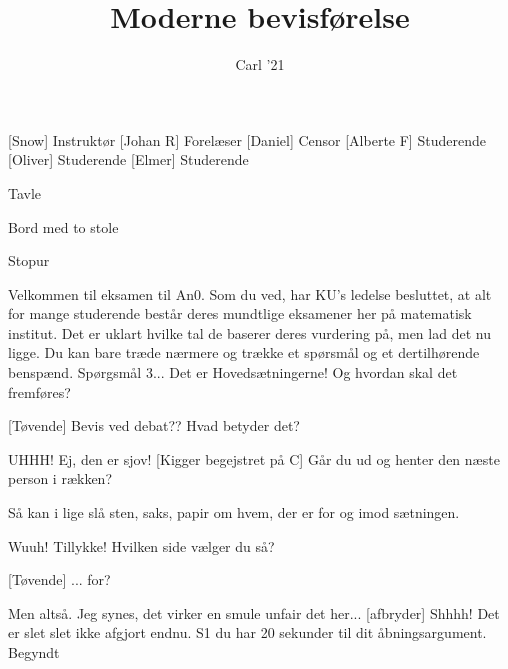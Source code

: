 \documentclass[a4paper,11pt]{article}
\title{Moderne bevisførelse}
\author{Carl '21}
\begin{document}
\maketitle

\begin{roles}
[Snow] Instruktør
[Johan R] Forelæser
[Daniel] Censor
[Alberte F] Studerende
[Oliver] Studerende
[Elmer] Studerende
\end{roles}

\begin{props}
\item Tavle
\item Bord med to stole
\item Stopur
\end{props}

\begin{sketch}
 Velkommen til eksamen til An0. Som du ved, har KU’s ledelse besluttet, at alt for mange studerende består deres mundtlige eksamener
her på matematisk institut. Det er uklart hvilke tal de baserer deres vurdering på, men lad det nu ligge. Du kan bare træde nærmere og trække et spørsmål og et dertilhørende benspænd.
 Spørgsmål 3... Det er Hovedsætningerne! Og hvordan skal det fremføres?

[Tøvende] Bevis ved debat?? Hvad betyder det?

 UHHH! Ej, den er sjov!
[Kigger begejstret på C] Går du ud og henter den næste person i rækken?


 Så kan i lige slå sten, saks, papir om hvem, der er for og imod sætningen.


 Wuuh! Tillykke! Hvilken side vælger du så?

[Tøvende] ... for?

 Men altså. Jeg synes, det virker en smule unfair det her...
[afbryder] Shhhh! Det er slet slet ikke afgjort endnu. S1 du har 20 sekunder til dit åbningsargument. Begyndt


\end{sketch}
\end{document}
